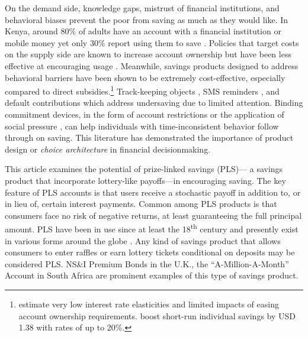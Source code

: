 \documentclass[11pt]{article}
\begin{document}
	On the demand side, knowledge gaps, mistrust of financial institutions, and behavioral biases prevent the poor from saving as much as they would like. In Kenya, around 80\% of adults have an account with a financial institution or mobile money yet only 30\% report using them to save \parencite{demirguc-kunt_global_2018}. Policies that target costs on the supply side are known to increase account ownership but have been less effective at encouraging usage \parencite{dupas_why_2013,karlan_banking_2016}. Meanwhile, savings products designed to address behavioral barriers have been shown to be extremely cost-effective, especially compared to direct subsidies.\footnote{\textcite{karlan_price_2018} estimate very low interest rate elasticities and limited impacts of easing account ownership requirements. \textcite{schaner_persistent_2018} boost short-run individual savings by USD 1.38 with rates of up to 20\%.} Track-keeping objects \parencite{akbas_how_2016}, SMS reminders \parencite{karlan_getting_2010}, and default contributions \parencite{thaler_save_2004,chetty_active_2014,somville_saving_2018} which address undersaving due to limited attention. Binding commitment devices, in the form of account restrictions \parencite{ashraf_tying_2006} or the application of social pressure \parencite{dupas_why_2013}, can help individuals with time-inconsistent behavior follow through on saving. This literature has demonstrated the importance of product design or \textit{choice architecture} in financial decisionmaking.

	This article examines the potential of prize-linked savings (PLS)--- a savings product that incorporate lottery-like payoffs---in encouraging saving. The key feature of PLS accounts is that users receive a stochastic payoff in addition to, or in lieu of, certain interest payments. Common among PLS products is that consumers face no risk of negative returns, at least guaranteeing the full principal amount. PLS have been in use since at least the 18\textsuperscript{th} century and presently exist in various forms around the globe \parencite{murphy_lotteries_2005,kearney_making_2010}. Any kind of savings product that allows consumers to enter raffles or earn lottery tickets conditional on deposits may be considered PLS. NS\&I Premium Bonds in the U.K., the ``A-Million-A-Month'' Account in South Africa are prominent examples of this type of savings product.

\end{document}
